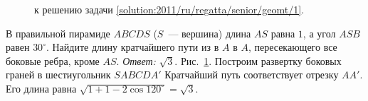 \ifsolution
\begin{figure}\centering
    \caption{к решению задачи \ref{solution:2011/ru/regatta/senior/geomt/1}.}
    \label{fig:solution:2011/ru/regatta/senior/geomt/1}
\end{figure}
\fi %

\problem
В правильной пирамиде $ABCDS$ ($S$~--- вершина) длина $AS$ равна $1$, а угол
$ASB$ равен $30^\circ$.
Найдите длину кратчайшего пути из в $A$ в $A$, пересекающего все боковые ребра,
кроме $AS$.
\solution
\label{solution:2011/ru/regatta/senior/geomt/1}%
\emph{Ответ:} $\sqrt{3}$.
Рис.~\ref{fig:solution:2011/ru/regatta/senior/geomt/1}.
Построим развертку боковых граней в шестиугольник $SABCDA'$
Кратчайший путь соответствует отрезку $AA'$.
Его длина равна $\sqrt{1 + 1 - 2 \cos 120^\circ} = \sqrt{3}$.
\endproblem
